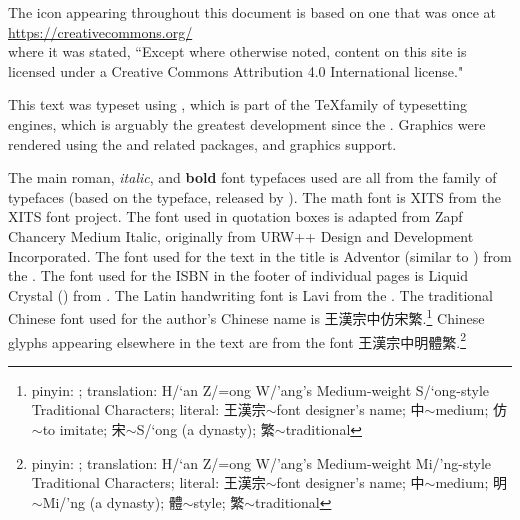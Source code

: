 The icon 
appearing throughout this document is based on one that was once at 
\\\indentx\url{https://creativecommons.org/}\\
where it was stated, 
``Except where otherwise noted, content on this site is licensed under a Creative Commons Attribution 4.0 International license."
\vfill
{\sffamily
This text was typeset using \hi{\XeLaTeX},
which is part of the \TeX family of typesetting engines, 
which is arguably the greatest development since the .
Graphics were rendered using the  and related packages, and \hi{\LaTeX} graphics support.

The main {\rmfamily roman}, {\itshape italic}, and {\bfseries bold} font typefaces used 
are all from the  family of typefaces
(based on the  typeface, released by ).
The math font is {{\fntXits XITS}} from the {{\fntXits XITS font project}}.
The font used in quotation boxes is adapted from {\fntZapf Zapf Chancery Medium Italic},
originally from URW++ Design and Development Incorporated.
The font used for the text in the title is {\fntAdventor Adventor} (similar to ) from the .
The font used for the ISBN in the footer of individual pages is 
\mbox{\fntDigital\footnotesize Liquid} \mbox{\fntDigital\footnotesize Crystal} 
() from .
The Latin handwriting font is {\fntLavi Lavi} from the .
The traditional Chinese font used for the author's Chinese name is {{\fntzhthw 王漢宗中仿宋繁}}.\footnote{\sffamily%
pinyin: ; 
translation: H/`an Z/=ong W/'ang's Medium-weight S/`ong-style Traditional Characters;
literal:
{\fntzhthw 王漢宗}$\sim$font designer's name;
{\fntzhthw 中}$\sim$medium;
{\fntzhthw 仿}$\sim$to imitate;
{\fntzhthw 宋}$\sim$S/`ong (a dynasty);
{\fntzhthw 繁}$\sim$traditional
}
Chinese glyphs appearing elsewhere in the text are from the font {{\fntzht 王漢宗中明體繁}}.\footnote{\sffamily%
pinyin: ; 
translation: H/`an Z/=ong W/'ang's Medium-weight Mi{/'n}g-style Traditional Characters;
literal:
{\fntzhthw 王漢宗}$\sim$font designer's name;
{\fntzhthw 中}$\sim$medium;
{\fntzhthw 明}$\sim$Mi{/'n}g (a dynasty);
{\fntzhthw 體}$\sim$style;
{\fntzhthw 繁}$\sim$traditional
}

}
